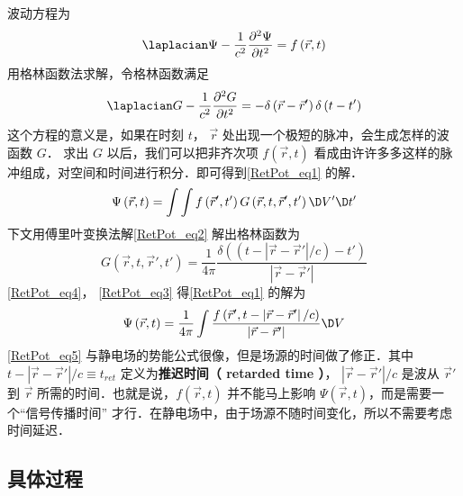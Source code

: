 
波动方程为
\begin{equation}\label{RetPot_eq1}
{\laplacian}\Psi  - \frac{1}{{{c^2}}}\frac{{{\partial ^2}\Psi }}{{\partial {t^2}}} = f\left( {\vec r,t} \right)
\end{equation} 
用格林函数法求解，令格林函数满足
\begin{equation}\label{RetPot_eq2}
{\laplacian}G - \frac{1}{{{c^2}}}\frac{{{\partial ^2}G}}{{\partial {t^2}}} =  - \delta \left( {\vec r - \vec r'} \right)\delta \left( {t - t'} \right)
\end{equation} 
这个方程的意义是，如果在时刻 $t$， $\vec r$ 处出现一个极短的脉冲，会生成怎样的波函数 $G$． 求出 $G$ 以后，我们可以把非齐次项 $f\left( {\vec r,t} \right)$ 看成由许许多多这样的脉冲组成，对空间和时间进行积分．即可得到\autoref{RetPot_eq1} 的解．
\begin{equation}\label{RetPot_eq3}
\Psi \left( {\vec r,t} \right) = \int {\int {f\left( {\vec r',t'} \right)G\left( {\vec r,t,\vec r',t'} \right)\D V'} \D t'} 
\end{equation} 
下文用傅里叶变换法解\autoref{RetPot_eq2} 解出格林函数为
\begin{equation}\label{RetPot_eq4}
G\left( {\vec r,t,\vec r',t'} \right) = \frac{1}{{4\pi }}\frac{{\delta \left( {\left( {t - \left| {\vec r - \vec r'} \right|/c} \right) - t'} \right)}}{{\left| {\vec r - \vec r'} \right|}}
\end{equation} 
\autoref{RetPot_eq4}， \autoref{RetPot_eq3} 得\autoref{RetPot_eq1} 的解为
\begin{equation}\label{RetPot_eq5}
\Psi \left( {\vec r,t} \right) = \frac{1}{{4\pi }}\int {\frac{{f\left( {\vec r',t - \left| {\vec r - \vec r'} \right|/c} \right)}}{{\left| {\vec r - \vec r'} \right|}}\D V} 
\end{equation} 
\autoref{RetPot_eq5} 与静电场的势能公式很像，但是场源的时间做了修正．其中 $t - \left| {\vec r - \vec r'} \right|/c \equiv {t_{ret}}$ 定义为\textbf{推迟时间（ retarded time ）}， $\left| {\vec r - \vec r'} \right|/c$ 是波从 $\vec r'$ 到 $\vec r$ 所需的时间．也就是说，$f\left( {\vec r,t} \right)$ 并不能马上影响 $\Psi \left( {\vec r,t} \right)$，而是需要一个“信号传播时间” 才行．在静电场中，由于场源不随时间变化，所以不需要考虑时间延迟．

\subsection{具体过程}

